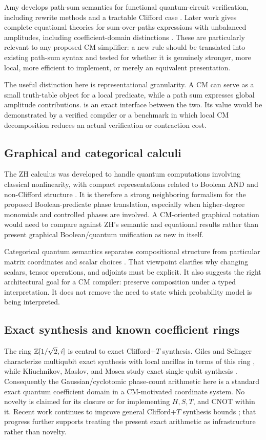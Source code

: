 Amy develops path-sum semantics for functional quantum-circuit verification, including rewrite methods and a tractable Clifford case \cite{amy2019}. Later work gives complete equational theories for sum-over-paths expressions with unbalanced amplitudes, including coefficient-domain distinctions \cite{amy2023}. These are particularly relevant to any proposed CM simplifier: a new rule should be translated into existing path-sum syntax and tested for whether it is genuinely stronger, more local, more efficient to implement, or merely an equivalent presentation.

The useful distinction here is representational granularity. A CM can serve as a small truth-table object for a local predicate, while a path sum expresses global amplitude contributions.  is an exact interface between the two. Its value would be demonstrated by a verified compiler or a benchmark in which local CM decomposition reduces an actual verification or contraction cost.

\subsection{Graphical and categorical calculi}
The ZH calculus was developed to handle quantum computations involving classical nonlinearity, with compact representations related to Boolean AND and non-Clifford structure \cite{zh}. It is therefore a strong neighboring formalism for the proposed Boolean-predicate phase translation, especially when higher-degree monomials and controlled phases are involved. A CM-oriented graphical notation would need to compare against ZH's semantic and equational results rather than present graphical Boolean/quantum unification as new in itself.

Categorical quantum semantics separates compositional structure from particular matrix coordinates and scalar choices \cite{abramsky}. That viewpoint clarifies why changing scalars, tensor operations, and adjoints must be explicit. It also suggests the right architectural goal for a CM compiler: preserve composition under a typed interpretation. It does not remove the need to state which probability model is being interpreted.

\subsection{Exact synthesis and known coefficient rings}
The ring $\mathbb Z[1/\sqrt2,i]$ is central to exact Clifford+$T$ synthesis. Giles and Selinger characterize multiqubit exact synthesis with local ancillas in terms of this ring \cite{giles}, while Kliuchnikov, Maslov, and Mosca study exact single-qubit synthesis \cite{kmm}. Consequently the Gaussian/cyclotomic phase-count arithmetic here is a standard exact quantum coefficient domain in a CM-motivated coordinate system. No novelty is claimed for its closure or for implementing $H,S,T$, and CNOT within it.  Recent work continues to improve general Clifford+$T$ synthesis bounds \cite{tan2026}; that progress further supports treating the present exact arithmetic as infrastructure rather than novelty.

